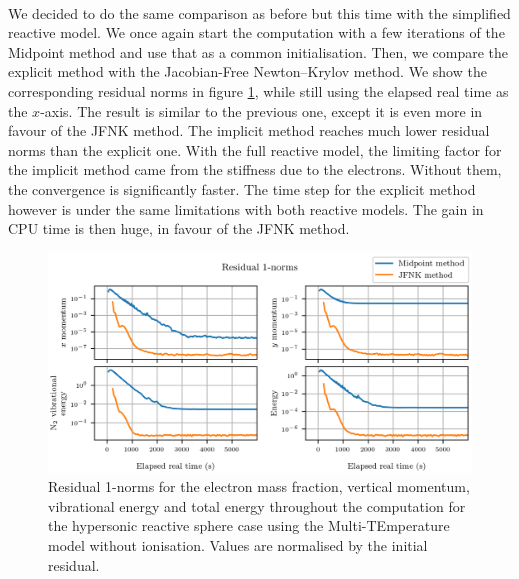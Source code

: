         \paragraph{}
        We decided to do the same comparison as before but this time with the simplified reactive model.
        We once again start the computation with a few iterations of the Midpoint method and use that as a common initialisation.
        Then, we compare the explicit method with the Jacobian-Free Newton--Krylov method.
        We show the corresponding residual norms in figure \ref{fig:sphere_tv_residuals}, while still using the elapsed real time as the $x$-axis.
        The result is similar to the previous one, except it is even more in favour of the JFNK method.
        The implicit method reaches much lower residual norms than the explicit one.
        With the full reactive model, the limiting factor for the implicit method came from the stiffness due to the electrons.
        Without them, the convergence is significantly faster.
        The time step for the explicit method however is under the same limitations with both reactive models.
        The gain in CPU time is then huge, in favour of the JFNK method.

        \begin{figure}
          \centering
          \includegraphics{figures/sphere_tv_residuals.png}
          \caption{Residual 1-norms for the electron mass fraction, vertical momentum,  vibrational energy and total energy throughout the computation for the hypersonic reactive sphere case using the Multi-TEmperature model without ionisation.
          Values are normalised by the initial residual.}
          \label{fig:sphere_tv_residuals}
        \end{figure}
